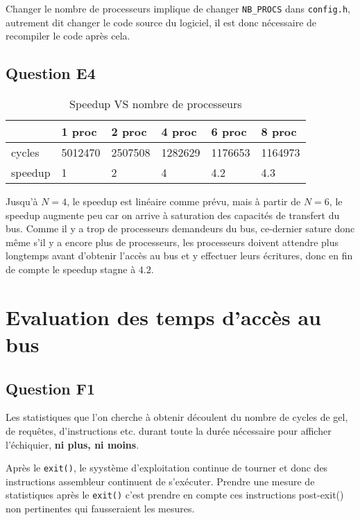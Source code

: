 \documentclass{article}
\begin{document}
Changer le nombre de processeurs implique de changer \texttt{NB\_PROCS} dans \texttt{config.h},
autrement dit changer le code source du logiciel, il est donc nécessaire de recompiler le code après cela.

\subsection{Question E4}

\begin{table}[H]
\centering
\begingroup
\setlength{\tabcolsep}{5pt}
\renewcommand{\arraystretch}{1.1}
\begin{tabular}{| l | l | l | l | l | l |}

\hline
	& 1 proc	& 2 proc	& 4 proc	& 6 proc	& 8 proc	\\
\hline
cycles	& 5012470	& 2507508	& 1282629	& 1176653	& 1164973	\\
\hline
speedup	& 1		& 2		& 4		& 4.2		& 4.3		\\
\hline

\end{tabular}
\caption{Speedup VS nombre de processeurs}
\endgroup
\end{table}

Jusqu'à $N = 4$, le speedup est linéaire comme prévu, mais à partir de $N = 6$, le speedup augmente peu car on arrive à saturation des capacités de transfert du bus. Comme il y a trop de processeurs demandeurs du bus, ce-dernier sature donc même s'il y a encore plus de processeurs, les processeurs doivent attendre plus longtemps avant d'obtenir l'accès au bus et y effectuer leurs écritures, donc en fin de compte le speedup stagne à $4.2$.


\section{Evaluation des temps d'accès au bus}

\subsection{Question F1}

Les statistiques que l'on cherche à obtenir découlent du nombre de cycles de gel, de requêtes, d'instructions etc. durant toute la durée nécessaire pour afficher l'échiquier, \textbf{ni plus, ni moins}.

Après le \texttt{exit()}, le syystème d'exploitation continue de tourner et donc des instructions assembleur continuent de s'exécuter. Prendre une mesure de statistiques après le \texttt{exit()} c'est prendre en compte ces instructions post-exit() non pertinentes qui fausseraient les mesures.
\end{document}
